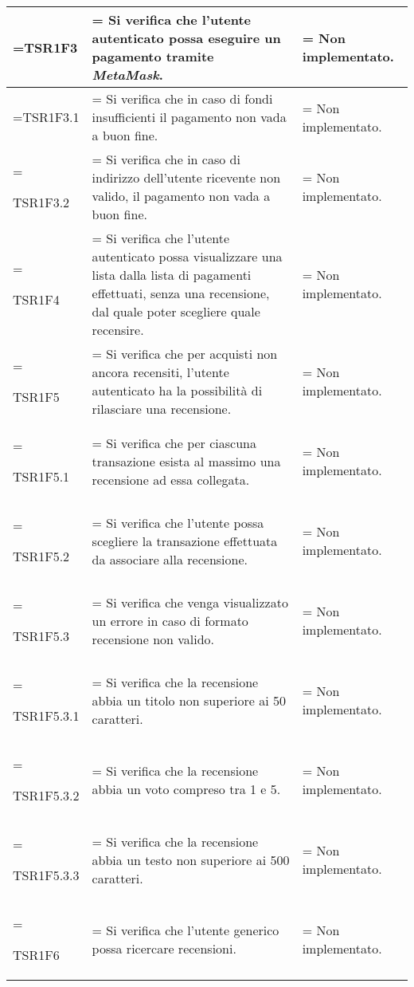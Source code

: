 \begin{xltabular}{\textwidth} {
        >{\hsize\linewidth=\hsize}X
        >{\hsize\linewidth=\hsize}X
        >{\hsize\linewidth=\hsize}X
    }
    TSR1F3&
    Si verifica che l'utente autenticato possa eseguire un pagamento tramite \textit{MetaMask}. &
    Non implementato.
    \\ \hline
    
    TSR1F3.1&
    Si verifica che in caso di fondi insufficienti il pagamento non vada a buon fine.&
    Non implementato.
    \\ \hline
    
    TSR1F3.2&
    Si verifica che in caso di indirizzo dell'utente ricevente non valido, il pagamento non vada a buon fine.&
    Non implementato.
    \\ \hline
    
    TSR1F4&
    Si verifica che l'utente autenticato possa visualizzare una lista dalla lista di pagamenti effettuati, senza una recensione, dal quale poter scegliere quale recensire.&
    Non implementato.
    \\ \hline

    TSR1F5&
    Si verifica che per acquisti non ancora recensiti, l'utente autenticato ha la possibilità di rilasciare una recensione.&
    Non implementato.
    \\ \hline

    TSR1F5.1&
    Si verifica che per ciascuna transazione esista al massimo una recensione ad essa collegata.&
    Non implementato.
    \\ \hline
    
    TSR1F5.2&
    Si verifica che l'utente possa scegliere la transazione effettuata da associare alla recensione.&
    Non implementato.
    \\ \hline

    TSR1F5.3&
    Si verifica che venga visualizzato un errore in caso di formato recensione non valido.&
    Non implementato.
    \\ \hline
    
    TSR1F5.3.1&
    Si verifica che la recensione abbia un titolo non superiore ai 50 caratteri.&
    Non implementato.
    \\ \hline

    TSR1F5.3.2&
    Si verifica che la recensione abbia un voto compreso tra 1 e 5.&
    Non implementato.
    \\ \hline

    TSR1F5.3.3&
    Si verifica che la recensione abbia un testo non superiore ai 500 caratteri.&
    Non implementato.
    \\ \hline

    TSR1F6&
    Si verifica che l'utente generico possa ricercare recensioni.&
    Non implementato.
    \\ \hline


\end{xltabular}
